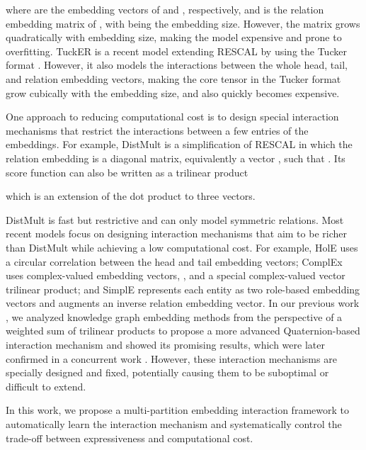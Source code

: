 \documentclass{ecai}
\theoremstyle{plain}  \newtheorem{thm}{Theorem}  \newtheorem{lem}[thm]{Lemma}  \newtheorem{prop}[thm]{Proposition}
\theoremstyle{remark}  \newtheorem*{rem}{Remark}
\begin{document}
where  are the embedding vectors of  and , respectively, and  is the relation embedding matrix of , with  being the embedding size. However, the matrix  grows quadratically with embedding size, making the model expensive and prone to overfitting. TuckER \cite{balazevic_tuckertensorfactorization_2019} is a recent model extending RESCAL by using the Tucker format \cite{tucker_mathematicalnotesthreemode_1966}. However, it also models the interactions between the whole head, tail, and relation embedding vectors, making the core tensor in the Tucker format grow cubically with the embedding size, and also quickly becomes expensive.

One approach to reducing computational cost is to design special interaction mechanisms that restrict the interactions between a few entries of the embeddings. For example, DistMult \cite{yang_embeddingentitiesrelations_2015} is a simplification of RESCAL in which the relation embedding is a diagonal matrix, equivalently a vector , such that . Its score function can also be written as a trilinear product

which is an extension of the dot product to three vectors. 

DistMult is fast but restrictive and can only model symmetric relations. Most recent models focus on designing interaction mechanisms that aim to be richer than DistMult while achieving a low computational cost. For example, HolE \cite{nickel_holographicembeddingsknowledge_2016} uses a circular correlation between the head and tail embedding vectors; ComplEx \cite{trouillon_complexembeddingssimple_2016} uses complex-valued embedding vectors, , and a special complex-valued vector trilinear product; and SimplE \cite{kazemi_simpleembeddinglink_2018,lacroix_canonicaltensordecomposition_2018} represents each entity as two role-based embedding vectors and augments an inverse relation embedding vector. In our previous work \cite{tran_analyzingknowledgegraph_2019}, we analyzed knowledge graph embedding methods from the perspective of a weighted sum of trilinear products to propose a more advanced Quaternion-based interaction mechanism and showed its promising results, which were later confirmed in a concurrent work \cite{zhang_quaternionknowledgegraph_2019}. However, these interaction mechanisms are specially designed and fixed, potentially causing them to be suboptimal or difficult to extend.

In this work, we propose a multi-partition embedding interaction framework to automatically learn the interaction mechanism and systematically control the trade-off between expressiveness and computational cost.
\end{document}
